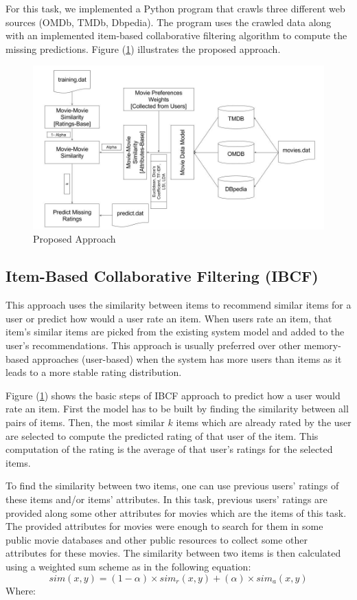 \documentclass{sigish}
\begin{document}
For this task, we implemented a Python program that crawls three different web sources (OMDb, TMDb, Dbpedia). The program uses the crawled data along with an implemented item-based collaborative filtering algorithm to compute the missing predictions. Figure (\ref{fig:approach}) illustrates the proposed approach.

\begin{figure}
\centering
\includegraphics[width=\columnwidth]{images/system_overview.jpg}
\caption{Proposed Approach}
\label{fig:approach}
\end{figure}

\subsection{Item-Based Collaborative Filtering (IBCF)}

This approach uses the similarity between items to recommend similar items for a user or predict how would a user rate an item. When users rate an item, that item's similar items are picked from the existing system model and added to the user's recommendations. This approach is usually preferred over other memory-based approaches (user-based) when the system has more users than items as it leads to a more stable rating distribution.

Figure (\ref{fig:approach}) shows the basic steps of IBCF approach to predict how a user would rate an item. First the model has to be built by finding the similarity between all pairs of items. Then, the most similar $ k $ items which are already rated by the user are selected to compute the predicted rating of that user of the item. This computation of the rating is the average of that user's ratings for the selected items.

To find the similarity between two items, one can use previous users' ratings of these items and/or items' attributes. In this task, previous users' ratings are provided along some other attributes for movies which are the items of this task. The provided attributes for movies were enough to search for them in some public movie databases and other public resources to collect some other attributes for these movies. The similarity between two items is then calculated using a weighted sum scheme as in the following equation:
\begin{equation}
sim(x, y) = (1 - \alpha) \times sim_{r}(x, y) + (\alpha) \times sim_{a}(x, y)
\end{equation}
Where:
\end{document}

